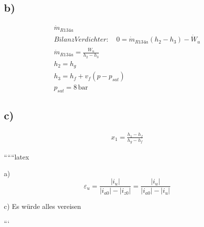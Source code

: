 \subsection*{b)}

\begin{align*}
\dot{m}_{R134a} \\
Bilanz Verdichter: \quad 0 = \dot{m}_{R134a} (h_2 - h_3) - \dot{W}_u \\
\dot{m}_{R134a} = \frac{\dot{W}_u}{h_2 - h_3} \\
h_2 = h_g \\
h_3 = h_f + v_f \left( p - p_{sat} \right) \\
p_{sat} = 8 \, \text{bar}
\end{align*}

\subsection*{c)}

\begin{align*}
x_1 = \frac{h_1 - h_f}{h_g - h_f}
\end{align*}

``````latex


a) \[
\varepsilon_{u} = \frac{|i_{u}|}{|i_{a0}| - |i_{z0}|} = \frac{|i_{u}|}{|i_{a0}| - |i_{u}|}
\]

c) Es würde alles vereisen

```
